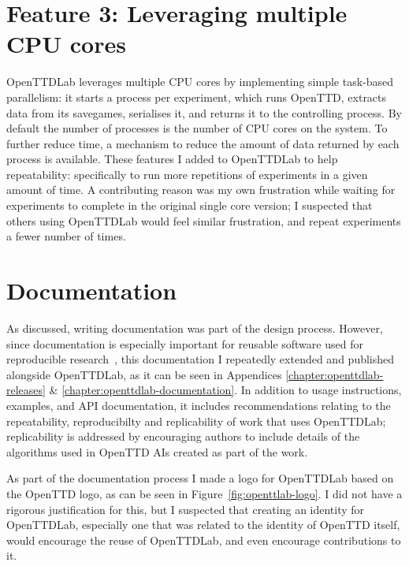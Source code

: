 \documentclass[logo,msc,dsti]{style/infthesis}    %
\begin{document}
{\section{Feature 3: Leveraging multiple CPU cores}

OpenTTDLab leverages multiple CPU cores by implementing simple task-based parallelism: it starts a process per experiment, which runs OpenTTD, extracts data from its savegames, serialises it, and returns it to the controlling process. By default the number of processes is the number of CPU cores on the system. To further reduce time, a mechanism to reduce the amount of data returned by each process is available. These features I added to OpenTTDLab to help repeatability: specifically to run more repetitions of experiments in a given amount of time. A contributing reason was my own frustration while waiting for experiments to complete in the original single core version; I suspected that others using OpenTTDLab would feel similar frustration, and repeat experiments a fewer number of times.

\section{Documentation}

As discussed, writing documentation was part of the design process. However, since documentation is especially important for reusable software used for reproducible research~\cite{turingway2022}, this documentation I repeatedly extended and published alongside OpenTTDLab, as it can be seen in Appendices \ref{chapter:openttdlab-releases} \& \ref{chapter:openttdlab-documentation}. In addition to usage instructions, examples, and API documentation, it includes recommendations relating to the repeatability, reproducibilty and replicability of work that uses OpenTTDLab; replicability is addressed by encouraging authors to include details of the algorithms used in OpenTTD AIs created as part of the work.

As part of the documentation process I made a logo for OpenTTDLab based on the OpenTTD logo, as can be seen in Figure~\ref{fig:openttlab-logo}. I did not have a rigorous justification for this, but I suspected that creating an identity for OpenTTDLab, especially one that was related to the identity of OpenTTD itself, would encourage the reuse of OpenTTDLab, and even encourage contributions to it.


}
\end{document}
